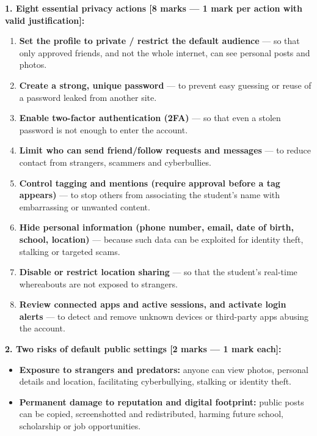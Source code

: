 \documentclass[11pt]{article}
\begin{document}
\begin{corrige}
\textbf{1. Eight essential privacy actions [8 marks — 1 mark per action with valid justification]:}
\begin{enumerate}
    \item \textbf{Set the profile to private / restrict the default audience} — so that only approved friends, and not the whole internet, can see personal posts and photos.
    \item \textbf{Create a strong, unique password} — to prevent easy guessing or reuse of a password leaked from another site.
    \item \textbf{Enable two-factor authentication (2FA)} — so that even a stolen password is not enough to enter the account.
    \item \textbf{Limit who can send friend/follow requests and messages} — to reduce contact from strangers, scammers and cyberbullies.
    \item \textbf{Control tagging and mentions (require approval before a tag appears)} — to stop others from associating the student's name with embarrassing or unwanted content.
    \item \textbf{Hide personal information (phone number, email, date of birth, school, location)} — because such data can be exploited for identity theft, stalking or targeted scams.
    \item \textbf{Disable or restrict location sharing} — so that the student's real-time whereabouts are not exposed to strangers.
    \item \textbf{Review connected apps and active sessions, and activate login alerts} — to detect and remove unknown devices or third-party apps abusing the account.
\end{enumerate}

\textbf{2. Two risks of default public settings [2 marks — 1 mark each]:}
\begin{itemize}
    \item \textbf{Exposure to strangers and predators:} anyone can view photos, personal details and location, facilitating cyberbullying, stalking or identity theft.
    \item \textbf{Permanent damage to reputation and digital footprint:} public posts can be copied, screenshotted and redistributed, harming future school, scholarship or job opportunities.
\end{itemize}
\end{corrige}
\end{document}
